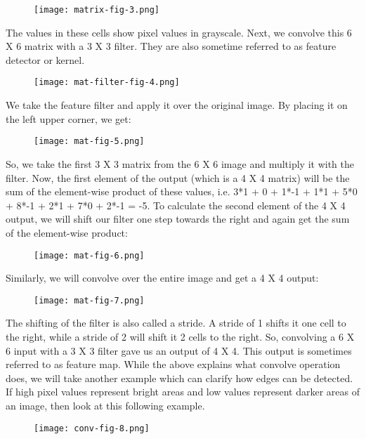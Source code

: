 \begin{figure}
  \texttt{[image: matrix-fig-3.png]}
\end{figure}

The values in these cells show pixel values in grayscale. Next, we convolve this 6 X 6 matrix with a 3 X 3 filter. They are also sometime referred to as feature detector or kernel.

\begin{figure}
  \texttt{[image: mat-filter-fig-4.png]}
\end{figure}

We take the feature filter and apply it over the original image. By placing it on the left upper corner, we get:

\begin{figure}
  \texttt{[image: mat-fig-5.png]}
\end{figure}

So, we take the first 3 X 3 matrix from the 6 X 6 image and multiply it with the filter. Now, the first element of the output (which is a 4 X 4 matrix) will be the sum of the element-wise product of these values, i.e. 3*1 + 0 + 1*-1 + 1*1 + 5*0 + 8*-1 + 2*1 + 7*0 + 2*-1 = -5. To calculate the second element of the 4 X 4 output, we will shift our filter one step towards the right and again get the sum of the element-wise product:

\begin{figure}
  \texttt{[image: mat-fig-6.png]}
\end{figure}

Similarly, we will convolve over the entire image and get a 4 X 4 output:

\begin{figure}
  \texttt{[image: mat-fig-7.png]}
\end{figure}

The shifting of the filter is also called a stride. A stride of 1 shifts it one cell to the right, while a stride of 2 will shift it 2 cells to the right. So, convolving a 6 X 6 input with a 3 X 3 filter gave us an output of 4 X 4. This output is sometimes referred to as feature map. While the above explains what convolve operation does, we will take another example which can clarify how edges can be detected. If high pixel values represent bright areas and low values represent darker areas of an image, then look at this following example.

\begin{figure}
  \texttt{[image: conv-fig-8.png]}
\end{figure}

